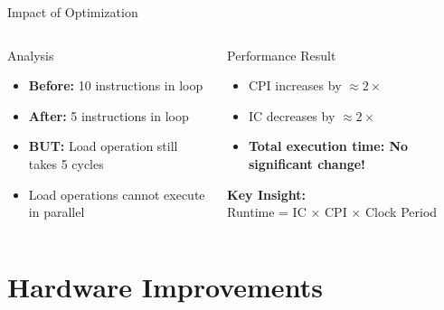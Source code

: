 \documentclass[aspectratio=169,12pt]{beamer}
\begin{document}
\begin{frame}{Impact of Optimization}
\begin{columns}[t]
\begin{block}{Analysis}
\begin{itemize}
    \item \textbf{Before:} 10 instructions in loop
    \item \textbf{After:} 5 instructions in loop
    \item \textbf{BUT:} Load operation still takes 5 cycles
    \item Load operations cannot execute in parallel
\end{itemize}
\end{block}

\begin{alertblock}{Performance Result}
\begin{itemize}
    \item CPI increases by $\approx 2\times$
    \item IC decreases by $\approx 2\times$
    \item \textbf{Total execution time: No significant change!}
\end{itemize}

\vspace{0.3cm}
\textbf{Key Insight:}\\
Runtime = IC × CPI × Clock Period
\end{alertblock}
\end{columns}
\end{frame}

\section{Hardware Improvements}
\end{document}
